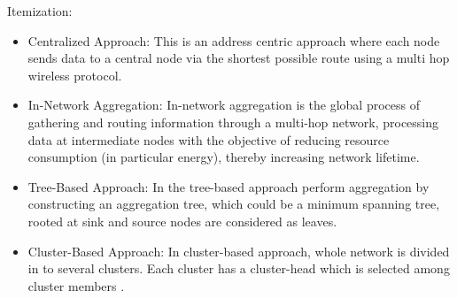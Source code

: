 Itemization: \\[1ex]
\begin{itemize}
\item Centralized Approach: This is an address centric approach where each node sends data to a central node via the shortest possible route using a multi hop wireless protocol.
\item In-Network Aggregation: In-network aggregation is the global process of gathering and routing information through a multi-hop network, processing data at intermediate nodes with the objective of reducing resource consumption (in particular energy), thereby increasing network lifetime. 
\item Tree-Based Approach: In the tree-based approach perform aggregation by constructing an aggregation tree, which could be a minimum spanning tree, rooted at sink and source nodes are considered as leaves.
\item Cluster-Based Approach: In cluster-based approach, whole network is divided in to several clusters. Each cluster has a cluster-head which is selected among cluster members \cite{RW2}.
\end{itemize}


